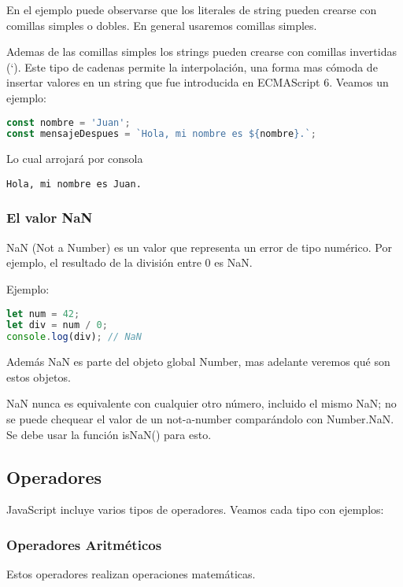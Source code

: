 \documentclass{book}
\begin{document}
En el ejemplo puede observarse que los literales de string pueden crearse con comillas simples o dobles. En general usaremos comillas simples.

Ademas de las comillas simples los strings pueden crearse con comillas invertidas (`). Este tipo de cadenas permite la interpolación, una forma
mas cómoda de insertar valores en un string que fue introducida en ECMAScript 6. Veamos un ejemplo:

\begin{lstlisting}[language=JavaScript, caption=Interpolación de cadenas]
const nombre = 'Juan';
const mensajeDespues = `Hola, mi nombre es ${nombre}.`;
\end{lstlisting}

Lo cual arrojará por consola

\begin{verbatim}
Hola, mi nombre es Juan.
\end{verbatim}


\subsubsection{El valor NaN}
NaN (Not a Number) es un valor que representa un error de tipo numérico. Por ejemplo, el resultado de la división entre 0 es NaN.

Ejemplo:

\begin{lstlisting}[language=JavaScript]
let num = 42;
let div = num / 0;
console.log(div); // NaN
\end{lstlisting}

Además NaN es parte del objeto global Number, mas adelante veremos qué son estos objetos.

NaN nunca es equivalente con cualquier otro número, incluido el mismo NaN; no se puede chequear el valor de un not-a-number comparándolo con Number.NaN. Se debe usar la función isNaN() para esto.

\subsection{Operadores}
JavaScript incluye varios tipos de operadores. Veamos cada tipo con ejemplos:

\subsubsection{Operadores Aritméticos}
Estos operadores realizan operaciones matemáticas.
\end{document}
